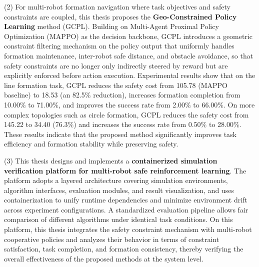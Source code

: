 \begin{EnglishAbstract}
    (2) For multi-robot formation navigation where task objectives and safety constraints are coupled, this thesis proposes the \textbf{Geo-Constrained Policy Learning} method (GCPL). Building on Multi-Agent Proximal Policy Optimization (MAPPO) as the decision backbone, GCPL introduces a geometric constraint filtering mechanism on the policy output that uniformly handles formation maintenance, inter-robot safe distance, and obstacle avoidance, so that safety constraints are no longer only indirectly steered by reward but are explicitly enforced before action execution.
    Experimental results show that on the line formation task, GCPL reduces the safety cost from 105.78 (MAPPO baseline) to 18.53 (an 82.5\% reduction), increases formation completion from 10.00\% to 71.00\%, and improves the success rate from 2.00\% to 66.00\%. On more complex topologies such as circle formation, GCPL reduces the safety cost from 145.22 to 34.40 (76.3\%) and increases the success rate from 0.50\% to 28.00\%. These results indicate that the proposed method significantly improves task efficiency and formation stability while preserving safety.
    
    (3) This thesis designs and implements a \textbf{containerized simulation verification platform for multi-robot safe reinforcement learning}. The platform adopts a layered architecture covering simulation environments, algorithm interfaces, evaluation modules, and result visualization, and uses containerization to unify runtime dependencies and minimize environment drift across experiment configurations. A standardized evaluation pipeline allows fair comparison of different algorithms under identical task conditions. On this platform, this thesis integrates the safety constraint mechanism with multi-robot cooperative policies and analyzes their behavior in terms of constraint satisfaction, task completion, and formation consistency, thereby verifying the overall effectiveness of the proposed methods at the system level.

\end{EnglishAbstract}
